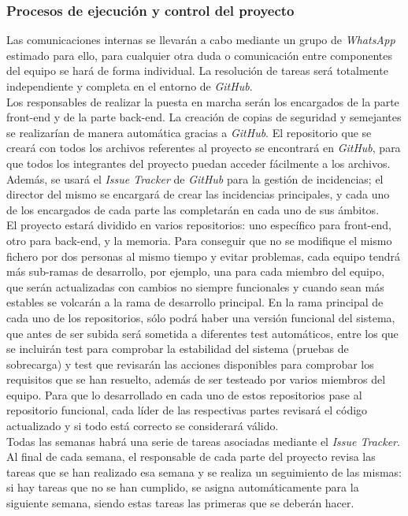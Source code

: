 \documentclass{article}
\begin{document}
\subsubsection{Procesos de ejecución y control del proyecto}
Las comunicaciones internas se llevarán a cabo mediante un grupo de \textit{WhatsApp} estimado para ello, para cualquier otra duda o comunicación entre componentes del equipo se hará de forma individual. La resolución de tareas será totalmente independiente y completa en el entorno de \textit{GitHub}.\\
\hfill \break
Los responsables de realizar la puesta en marcha serán los encargados de la parte front-end y de la parte back-end. La creación de copias de seguridad y semejantes se realizarían de manera automática gracias a \textit{GitHub}. 
\hfill \break
El repositorio que se creará con todos los archivos referentes al proyecto se encontrará en \textit{GitHub}, para que todos los integrantes del proyecto puedan acceder fácilmente a los archivos. Además, se usará el \textit{Issue Tracker} de \textit{GitHub} para la gestión de incidencias; el director del mismo se encargará de crear las incidencias principales, y cada uno de los encargados de cada parte las completarán en cada uno de sus ámbitos.\\
\hfill \break
El proyecto estará dividido en varios repositorios: uno específico para front-end, otro para back-end, y la memoria. Para conseguir que no se modifique el mismo fichero por dos personas al mismo tiempo y evitar problemas, cada equipo tendrá más sub-ramas de desarrollo, por ejemplo, una para cada miembro del equipo, que serán actualizadas con cambios no siempre funcionales y cuando sean más estables se volcarán a la rama de desarrollo principal. 
\hfill \break
En la rama principal de cada uno de los repositorios, sólo podrá haber una versión funcional del sistema, que antes de ser subida será sometida a diferentes test automáticos, entre los que se incluirán test para comprobar la estabilidad del sistema (pruebas de sobrecarga) y test que revisarán las acciones disponibles para comprobar los requisitos que se han resuelto, además de ser testeado por varios miembros del equipo. 
\hfill \break
Para que lo desarrollado en cada uno de estos repositorios pase al repositorio funcional, cada líder de las respectivas partes revisará el código actualizado y si todo está correcto se considerará válido. \\
\hfill \break 
Todas las semanas habrá una serie de tareas asociadas mediante el \textit{Issue Tracker}. Al final de cada semana, el responsable de cada parte del proyecto revisa las tareas que se han realizado esa semana y se realiza un seguimiento de las mismas: si hay tareas que no se han cumplido, se asigna automáticamente para la siguiente semana, siendo estas tareas las primeras que se deberán hacer.  
\end{document}
